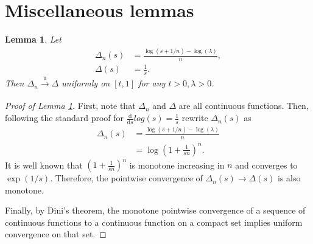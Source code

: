 \documentclass[a4paper]{article}
\newtheorem{lemma}{Lemma}
\begin{document}
\appendix

\printbibliography

\section{Miscellaneous lemmas}

\begin{lemma}
    \label{lemma:log_convergence}
    Let 
    \begin{align*}
        \Delta_n(s) &= \frac{\log(s + 1/n) - \log(\lambda)}{n}, \\
        \Delta(s) &= \frac{1}{s}.
    \end{align*}
    Then $\Delta_n \xrightarrow[]{\mathrm{u}} \Delta$ uniformly on $[t, 1]$ for any $t > 0, \lambda > 0$.
\end{lemma}
\begin{proof}[Proof of Lemma \ref{lemma:log_convergence}]
    First, note that $\Delta_n$ and $\Delta$ are all continuous functions.
    Then, following the standard proof for $\frac{\mathrm{d}}{\mathrm{d}s}log(s) = \frac{1}{s}$ rewrite $\Delta_n(s)$ as
    \begin{align*}
        \Delta_n(s) &= \frac{\log(s + 1/n) - \log(\lambda)}{n} \\
        &= \log \left( 1 + \frac{1}{sn} \right) ^ n .
    \end{align*}
    It is well known that $\left( 1 + \frac{1}{sn} \right) ^ n$ is monotone increasing in $n$ and converges to $\exp (1/s)$.
    Therefore, the pointwise convergence of $\Delta_n(s) \to \Delta(s)$ is also monotone.

    Finally, by Dini's theorem, the monotone pointwise convergence of a sequence of continuous functions to a continuous function on a compact set implies uniform convergence on that set.
\end{proof}
\end{document}
